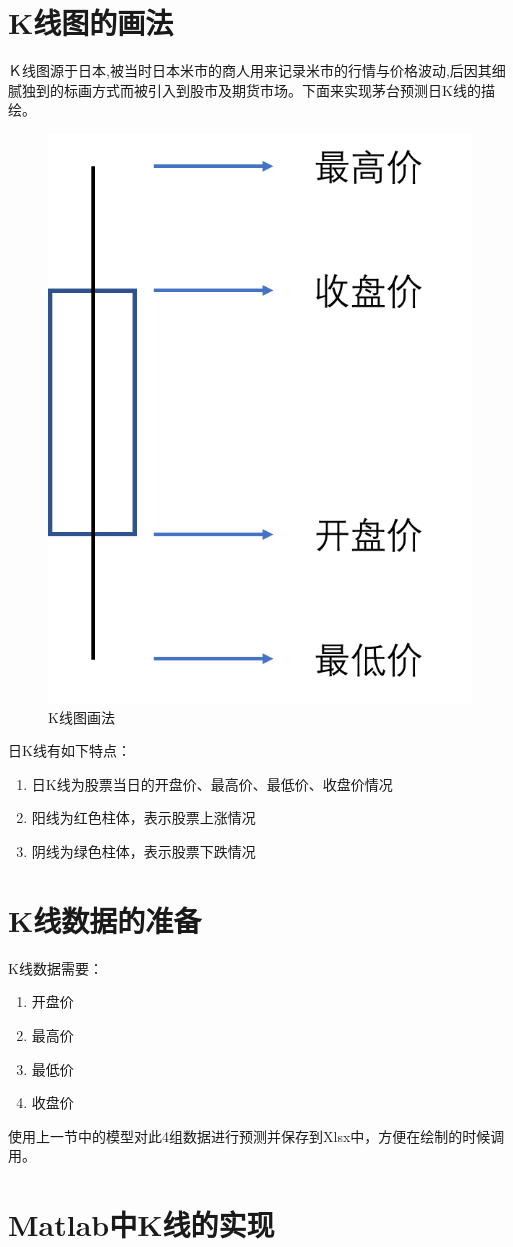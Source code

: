 \documentclass{jnuthesis}
\begin{document}
\section{K线图的画法}

 Ｋ线图源于日本,被当时日本米市的商人用来记录米市的行情与价格波动,后因其细腻独到的标画方式而被引入到股市及期货市场。下面来实现茅台预测日K线的描绘。
 \begin{figure}[H]
 	\centering
 	\includegraphics[width=0.3\linewidth]{pic/screenshot030}
 	\caption{K线图画法}
 	\label{fig:screenshot030}
 \end{figure}
 

日K线有如下特点\cite{Klinesgv}：
\begin{enumerate}
	\item 日K线为股票当日的开盘价、最高价、最低价、收盘价情况
	\item 阳线为红色柱体，表示股票上涨情况
	\item 阴线为绿色柱体，表示股票下跌情况
\end{enumerate}

\section{K线数据的准备}

K线数据需要：
\begin{enumerate}
	\item 开盘价
	\item 最高价
	\item 最低价
	\item 收盘价
\end{enumerate}

使用上一节中的模型对此4组数据进行预测并保存到Xlsx中，方便在绘制的时候调用。

\section{Matlab中K线的实现\cite{Kline}}
\end{document}
